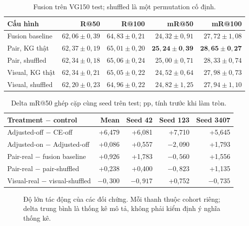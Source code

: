 \begin{table}[H]\centering\small
\caption{Fusion trên VG150 test; shuffled là một permutation cố định.}\label{tab:fusion}
\begin{tabular}{@{}lrrrr@{}}\toprule
Cấu hình & R@50 & R@100 & mR@50 & mR@100\\\midrule
Fusion baseline & $62,06\pm0,39$ & $64,83\pm0,21$ & $24,32\pm0,91$ & $27,72\pm1,08$\\
Pair, KG thật & $62,37\pm0,19$ & $65,01\pm0,20$ & $\mathbf{25,24\pm0,39}$ & $\mathbf{28,65\pm0,27}$\\
Pair, shuffled & $62,34\pm0,18$ & $65,06\pm0,24$ & $25,00\pm0,71$ & $28,33\pm0,74$\\
Visual, KG thật & $62,34\pm0,21$ & $65,05\pm0,22$ & $24,52\pm0,64$ & $27,98\pm0,73$\\
Visual, shuffled & $62,20\pm0,23$ & $64,96\pm0,22$ & $24,82\pm1,25$ & $27,94\pm1,10$\\
\bottomrule\end{tabular}\end{table}

\begin{table}[H]\centering\small
\caption{Delta mR@50 ghép cặp cùng seed trên test; pp, tính trước khi làm tròn.}
\begin{tabular}{@{}lrrrr@{}}\toprule
Treatment $-$ control & Mean & Seed 42 & Seed 123 & Seed 3407\\\midrule
Adjusted-off $-$ CE-off & +6,479 & +6,081 & +7,710 & +5,645\\
Adjusted-on $-$ Adjusted-off & +0,086 & +0,557 & $-2,090$ & +1,793\\
Pair-real $-$ fusion baseline & +0,926 & +1,783 & $-0,560$ & +1,556\\
Pair-real $-$ pair-shuffled & +0,238 & +0,400 & $-0,823$ & +1,135\\
Visual-real $-$ visual-shuffled & $-0,300$ & $-0,917$ & +0,752 & $-0,735$\\
\bottomrule\end{tabular}\end{table}

\begin{figure}[H]\centering
{}
\caption{Độ lớn tác động của các đối chứng. Mỗi thanh thuộc cohort riêng;
delta trung bình là thống kê mô tả, không phải kiểm định ý nghĩa thống kê.}
\end{figure}

